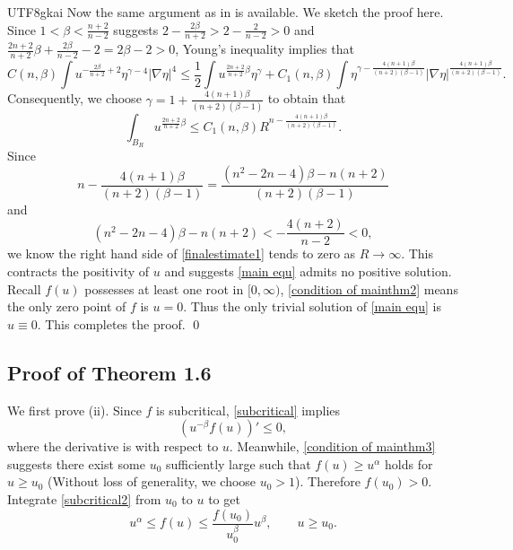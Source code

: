 \documentclass[reqno,12pt]{amsart}
\numberwithin{equation}{section}
\begin{document}
\begin{CJK}{UTF8}{gkai}
   Now the same argument as in \cite{MW} is available.  We sketch the proof here. Since  $1<\beta<\frac{n+2}{n-2}$ suggests $2-\frac{2\beta}{n+2}>2-\frac{2}{n-2}>0$ and $\frac{2n+2}{n+2}\beta+\frac{2\beta}{n-2}-2=2\beta-2>0$, Young's inequality implies that
   \begin{equation*}
   	     C(n,\beta)\int  u^{-\frac{2\beta}{n+2}+2}\eta^{\gamma-4}|\nabla \eta|^{4}\le \frac{1}{2} \int u^{\frac{2n+2}{n+2}\beta} \eta^{\gamma}
   	     +C_{1}(n,\beta)\int \eta^{\gamma-\frac{4(n+1)\beta}{(n+2)(\beta-1)}}
   	     |\nabla \eta|^{\frac{4(n+1)\beta}{(n+2)(\beta-1)}}.
   \end{equation*}
   Consequently, we choose $\gamma=1+\frac{4(n+1)\beta}{(n+2)(\beta-1)}$ to obtain that
   \begin{equation}\label{finalestimate1}
   		\int_{B_{R}} u^{\frac{2n+2}{n+2}\beta} \le C_{1}(n,\beta)R^{n-\frac{4(n+1)\beta}{(n+2)(\beta-1)}}.
   \end{equation} 
   Since
   \begin{equation*}
   	n-\frac{4(n+1)\beta}{(n+2)(\beta-1)}=\frac{(n^{2}-2n-4)\beta-n(n+2)}{(n+2)(\beta-1)}
   \end{equation*} 
   and
   \begin{equation*}
   	(n^{2}-2n-4)\beta-n(n+2)<-\frac{4(n+2)}{n-2}<0,
   \end{equation*} we know the right hand side of \eqref{finalestimate1} tends to zero as $R\to \infty$.
   This contracts the positivity of $u$ and suggests \eqref{main equ} admits no positive solution. Recall $f(u)$ possesses at least one root in $[0,\infty)$, \eqref{condition of mainthm2} means the only zero point of $f$ is $u=0$. Thus the only trivial solution of \eqref{main equ} is $u\equiv 0$. This completes the proof. \qed
   
   \subsection{Proof of Theorem 1.6}
   	  We first prove (ii). Since $f$ is subcritical, \eqref{subcritical} implies 
   	   \begin{equation}\label{subcritical2}
   	   	\left(u^{-\beta}f(u)\right)'\le 0,
   	   \end{equation}
   	   where the derivative is with respect to $u$. Meanwhile, \eqref{condition of mainthm3} suggests there exist some  $u_{0}$ sufficiently large such that 	$f(u)\ge u^{\alpha}$ holds for $u\ge u_{0}$ (Without loss of generality, we choose $u_{0}>1$). Therefore $f(u_{0})>0$. Integrate \eqref{subcritical2} from $u_{0}$ to $u$ to get
   	   \begin{equation}\label{inequ for u large}
   	   	    u^{\alpha}\le f(u)\le \frac{f(u_{0})}{u_{0}^{\beta}}u^{\beta},\qquad u\ge u_{0}.
   	   \end{equation}
   	   

\end{CJK}
\end{document}
